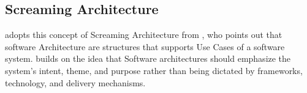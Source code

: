 \subsection{Screaming Architecture}

 adopts this concept of Screaming Architecture from
\textcite{jacobson_object-oriented_1992}, who points out that software Architecture are
structures that supports Use Cases of a software system.
\textcite[195]{robert_c_martin_clean_2018} builds on the idea that Software architectures
should emphasize the system's intent, theme, and purpose rather than being dictated by
frameworks, technology, and delivery mechanisms.